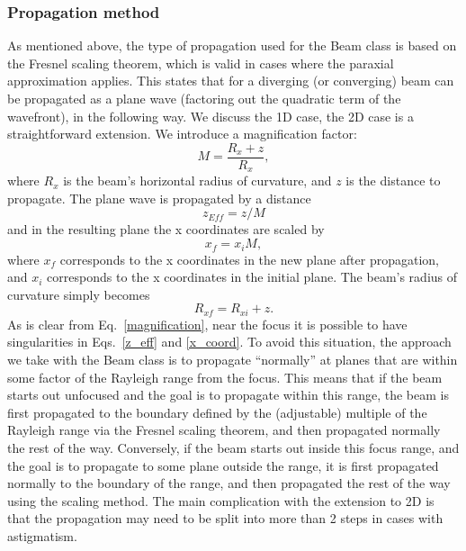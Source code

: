 \documentclass[11pt,fleqn]{article} %
\begin{document}
\subsubsection{Propagation method}
As mentioned above, the type of propagation used for the Beam class is based on the Fresnel scaling theorem, which is valid in cases where the paraxial approximation applies. This states that for a diverging (or converging) beam can be propagated as a plane wave (factoring out the quadratic term of the wavefront), in the following way. We discuss the 1D case, the 2D case is a straightforward extension. We introduce a magnification factor:
\begin{equation}
\label{magnification}
M = \frac{R_x + z}{R_x},
\end{equation}
where $R_x$ is the beam's horizontal radius of curvature, and $z$ is the distance to propagate. The plane wave is propagated by a distance
\begin{equation}
\label{z_eff}
z_{Eff} = z / M
\end{equation}
and in the resulting plane the x coordinates are scaled by
\begin{equation}
\label{x_coord}
x_f = x_i M,
\end{equation}
where $x_f$ corresponds to the x coordinates in the new plane after propagation, and $x_i$ corresponds to the x coordinates in the initial plane. The beam's radius of curvature simply becomes
\begin{equation}
R_{xf} = R_{xi} + z.
\end{equation}
As is clear from Eq.~\ref{magnification}, near the focus it is possible to have singularities in Eqs.~\ref{z_eff} and \ref{x_coord}. To avoid this situation, the approach we take with the Beam class is to propagate ``normally'' at planes that are within some factor of the Rayleigh range from the focus. This means that if the beam starts out unfocused and the goal is to propagate within this range, the beam is first propagated to the boundary defined by the (adjustable) multiple of the Rayleigh range via the Fresnel scaling theorem, and then propagated normally the rest of the way. Conversely, if the beam starts out inside this focus range, and the goal is to propagate to some plane outside the range, it is first propagated normally to the boundary of the range, and then propagated the rest of the way using the scaling method. The main complication with the extension to 2D is that the propagation may need to be split into more than 2 steps in cases with astigmatism.
\end{document}
